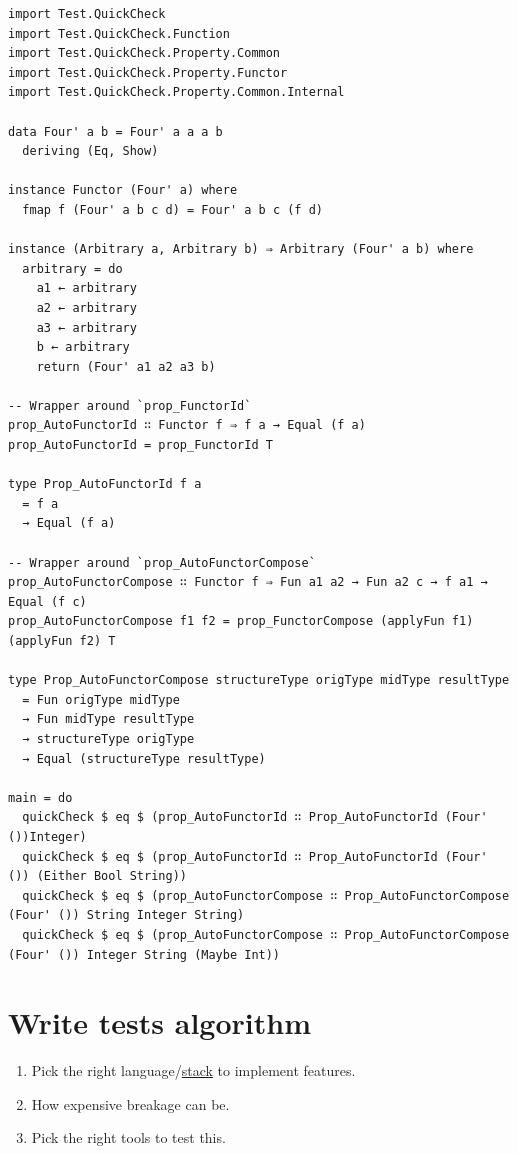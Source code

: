 \documentclass[a4paper,14pt,oneside]{book}
\begin{document}
\begin{verbatim}
import Test.QuickCheck
import Test.QuickCheck.Function
import Test.QuickCheck.Property.Common
import Test.QuickCheck.Property.Functor
import Test.QuickCheck.Property.Common.Internal

data Four' a b = Four' a a a b
  deriving (Eq, Show)

instance Functor (Four' a) where
  fmap f (Four' a b c d) = Four' a b c (f d)

instance (Arbitrary a, Arbitrary b) ⇒ Arbitrary (Four' a b) where
  arbitrary = do
    a1 ← arbitrary
    a2 ← arbitrary
    a3 ← arbitrary
    b ← arbitrary
    return (Four' a1 a2 a3 b)

-- Wrapper around `prop_FunctorId`
prop_AutoFunctorId ∷ Functor f ⇒ f a → Equal (f a)
prop_AutoFunctorId = prop_FunctorId T

type Prop_AutoFunctorId f a
  = f a
  → Equal (f a)

-- Wrapper around `prop_AutoFunctorCompose`
prop_AutoFunctorCompose ∷ Functor f ⇒ Fun a1 a2 → Fun a2 c → f a1 → Equal (f c)
prop_AutoFunctorCompose f1 f2 = prop_FunctorCompose (applyFun f1) (applyFun f2) T

type Prop_AutoFunctorCompose structureType origType midType resultType
  = Fun origType midType
  → Fun midType resultType
  → structureType origType
  → Equal (structureType resultType)

main = do
  quickCheck $ eq $ (prop_AutoFunctorId ∷ Prop_AutoFunctorId (Four' ())Integer)
  quickCheck $ eq $ (prop_AutoFunctorId ∷ Prop_AutoFunctorId (Four' ()) (Either Bool String))
  quickCheck $ eq $ (prop_AutoFunctorCompose ∷ Prop_AutoFunctorCompose (Four' ()) String Integer String)
  quickCheck $ eq $ (prop_AutoFunctorCompose ∷ Prop_AutoFunctorCompose (Four' ()) Integer String (Maybe Int))
\end{verbatim}

\section{Write tests algorithm}
\label{sec:orgc0b05d3}

\begin{enumerate}
\item Pick the right language/\hyperref[org5b21a02]{stack} to implement features.\\
\item How expensive breakage can be.\\
\item Pick the right tools to test this.\\
\end{enumerate}
\end{document}
